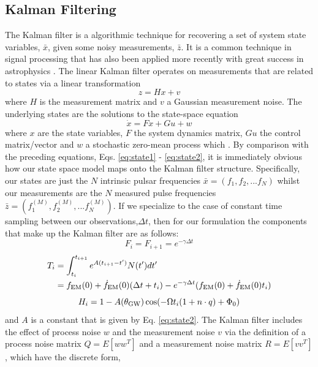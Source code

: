 \documentclass[fleqn,usenatbib,useAMS]{mnras}
\begin{document}
\subsection{Kalman Filtering}\label{sec:kalman_filter}
The Kalman filter \citep{Kalman1} is a algorithmic technique for recovering a set of system state variables, $\bar{x}$, given some noisy measurements, $\bar{z}$. It is a common technique in signal processing that has also been applied more recently with great success in astrophysics \citep[e.g.][]{Meyers2021,Melatos2023}. The linear Kalman filter operates on measurements that are related to states via a linear transformation
\begin{equation}
	z = Hx + v
\end{equation}
where $H$ is the measurement matrix and $v$ a Gaussian measurement noise. The underlying states are the solutions to the state-space equation 
\begin{equation}
	\dot{x} = Fx + Gu + w
\end{equation}
where $x$ are the state variables, $F$ the system dynamics matrix, $G u$ the control matrix/vector and $w$ a stochastic zero-mean process which .  By comparison with the preceding equations, Eqs. 	\ref{eq:state1} - 	\ref{eq:state2}, it is immediately obvious how our state space model maps onto the Kalman filter structure. Specifically, our states are just the $N$ intrinsic pulsar frequencies $\bar{x} = (f_1,f_2,...f_N)$ whilst our measurements are the $N$ measured pulse frequencies $\bar{z} = (f^{(M)}_1,f^{(M)}_2,...f^{(M)}_N)$. If we specialize to the case of constant time sampling between our observations,$\Delta t$, then for our formulation the components that make up the Kalman filter are as follows: 
\begin{equation}
	F_i = F_{i+1} = e^{-\gamma \Delta t}
\end{equation}
\begin{align}
	T_i &= \int_{t_i}^{t_{i+1}}  e^{A (t_{i+1} - t')} N(t') dt' \\
	    & = f_{\rm EM}(0) + \dot{f}_{\rm EM}(0)  (\Delta t + t_i) - e^{-\gamma \Delta t} (f_{\rm EM}(0) + \dot{f}_{\rm EM}(0)t_i)
\end{align}
\begin{equation}
	H_i = 1 -A(\theta_{\rm GW}) \cos(-\Omega t_i (1 + n\cdot q ) + \Phi_0)
\end{equation}
and $A$ is a constant that is given by  Eq. \ref{eq:state2}. The Kalman filter includes the effect of process noise $w$ and the measurement noise $v$ via the definition of a process noise matrix $Q = E[w w^T]$ and a measurement noise matrix $R = E[v v^T]$, which have the discrete form,
\end{document}
